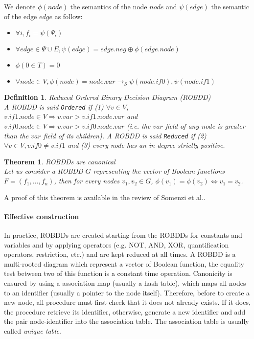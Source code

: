 \documentclass[a4paper,10pt]{article}
\newcommand{\shannon}[3]{#1 \longrightarrow_S #2, #3}
\newtheorem{newtheo}{Theorem}
\newcommand{\theorem}[2]{\begin{newtheo}{\textsf{#1}\\} #2 \end{newtheo}}
\newtheorem{newdef}{Definition}
\newcommand{\definition}[2]{\begin{newdef}{#1\\}#2\end{newdef}}
\begin{document}

We denote $\phi(node)$ the semantics of the node $node$ and $\psi(edge)$ the semantic of the edge $edge$ as follow:\begin{itemize}
\item $\forall i, f_i = \psi(\Psi_i)$
\item $\forall edge \in \Psi \cup E, \psi(edge) = edge.neg \oplus \phi(edge.\mathit{node})$
\item $\phi(0 \in T) = 0$
\item $\forall node \in V, \phi(node) = \shannon{node.\mathit{var}}{\psi(node.\mathit{if0})}{\psi(node.\mathit{if1})}$
\end{itemize}

\definition{Reduced Ordered Binary Decision Diagram (ROBDD)}
{
A ROBDD is said \texttt{Ordered} if (1) $\forall v\in V$, $v.\mathit{if1}.\mathit{node} \in V \Rightarrow v.\mathit{var} > v.\mathit{if1}.\mathit{node}.\mathit{var}$ and $v.\mathit{if0}.\mathit{node} \in V \Rightarrow v.\mathit{var} > v.\mathit{if0}.\mathit{node}.\mathit{var}$ (i.e. the $\mathit{var}$ field of any node is greater than the $\mathit{var}$ field of its children).
A ROBDD is said \texttt{Reduced} if (2) $\forall v\in V, v.if0 \neq v.if1$ and (3) every node has an in-degree strictly positive.
}

\theorem{ROBDDs are canonical}
{
Let us consider a ROBDD $G$ representing the vector of Boolean functions $F=(f_1, ..., f_n)$, then for every nodes $v_1, v_2 \in G$, $\phi(v_1) = \phi(v_2) \Leftrightarrow v_1 = v_2$.
}
A proof of this theorem is available in the review of Somenzi et al.\cite{Somenzi1999}.

\paragraph{Effective construction\\}
In practice, ROBDDs are created starting from the ROBDDs for constants and variables and by applying operators (e.g. NOT, AND, XOR, quantification operators, restriction, etc.) and are kept reduced at all times.
A ROBDD is a multi-rooted diagram which represent a vector of Boolean function, the equality test between two of this function is a constant time operation.
Canonicity is ensured by using a association map (usually a hash table), which maps all nodes to an identifier (usually a pointer to the node itself).
Therefore, before to create a new node, all procedure must first check that it does not already exists. If it does, the procedure retrieve its identifier, otherwise, generate a new identifier and add the pair node-identifier into the association table.
The association table is usually called \textit{unique table}.
\end{document}
